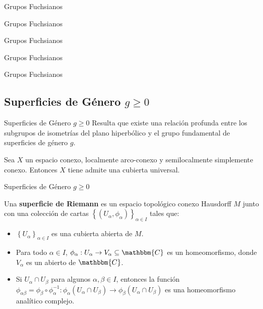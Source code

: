 \documentclass[xcolor=dvipsnames]{beamer}
\theoremstyle{largebreak}
\newcommand\cf[3]{\ensuremath{#1:#2\rightarrow#3}}
\newcommand{\bbm}[1]{\ensuremath{\mathbbm{#1}}}
\begin{document}
\begin{frame}{Grupos Fuchsianos}
    
\end{frame}

\begin{frame}{Grupos Fuchsianos}
    
\end{frame}

\begin{frame}{Grupos Fuchsianos}
    
\end{frame}

\begin{frame}{Grupos Fuchsianos}
    
\end{frame}

\begin{frame}{Grupos Fuchsianos}
    
\end{frame}

\subsection{Superficies de Género $g\geq0$}

\begin{frame}{Superficies de Género $g\geq0$}
    Resulta que existe una relación profunda entre los subgrupos de isometrías del plano hiperbólico y el grupo fundamental de superficies de género $g$.

    \begin{theor}
        Sea $X$ un espacio conexo, localmente arco-conexo y semilocalmente simplemente conexo. Entonces $X$ tiene admite una cubierta universal.
    \end{theor}
\end{frame}

\begin{frame}{Superficies de Género $g\geq0$}
    \begin{mydef}
        Una \textbf{superficie de Riemann} es un espacio topológico conexo Hausdorff $M$ junto con una colección de cartas $\left\{(U_\alpha,\phi_\alpha) \right\}_{\alpha\in I}$ tales que:
        \begin{itemize}
            \item $\left\{U_\alpha \right\}_{\alpha\in I}$ es una cubierta abierta de $M$.
            \item Para todo $\alpha\in I$, $\cf{\phi_{\alpha}}{U_\alpha}{V_\alpha\subseteq\bbm{C}}$ es un homeomorfismo, donde $V_\alpha$ es un abierto de $\bbm{C}$.
            \item Si $U_\alpha\cap U_\beta$ para algunos $\alpha,\beta\in I$, entonces la función $\cf{\phi_{\alpha\beta}=\phi_\beta\circ\phi_\alpha^{-1}}{\phi_\alpha(U_\alpha\cap U_\beta)}{\phi_\beta(U_\alpha\cap U_\beta)}$ es una homeomorfismo analítico complejo.
        \end{itemize}
    \end{mydef}
\end{frame}
\end{document}
